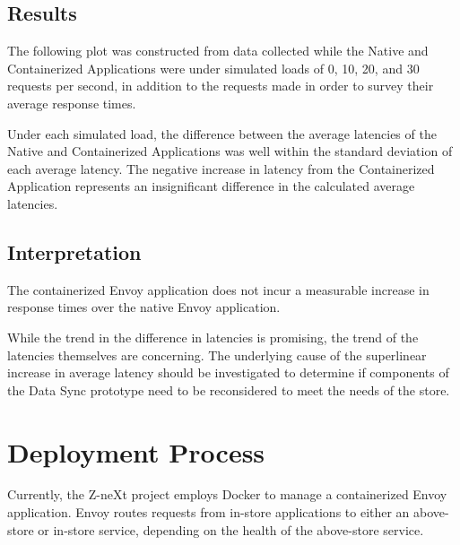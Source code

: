 \documentclass{article}
\begin{document}
\subsection{Results}
The following plot was constructed from data collected while the Native and Containerized Applications were under simulated loads of 0, 10, 20, and 30 requests per second, in addition to the requests made in order to survey their average response times.


Under each simulated load, the difference between the average latencies of the Native and Containerized Applications was well within the standard deviation of each average latency. The negative increase in latency from the Containerized Application represents an insignificant difference in the calculated average latencies.

\subsection{Interpretation}
The containerized Envoy application does not incur a measurable increase in response times over the native Envoy application.

While the trend in the difference in latencies is promising, the trend of the latencies themselves are concerning. The underlying cause of the superlinear increase in average latency should be investigated to determine if components of the Data Sync prototype need to be reconsidered to meet the needs of the store.

\section{Deployment Process}
Currently, the Z-neXt project employs Docker to manage a containerized Envoy application. Envoy routes requests from in-store applications to either an above-store or in-store service, depending on the health of the above-store service.
\end{document}
